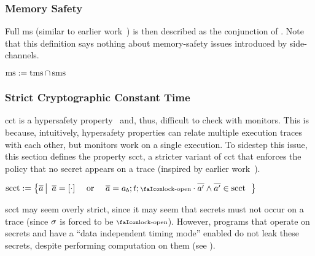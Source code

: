\documentclass[dvipsnames]{llncs}
\begin{document}
\subsubsection{Memory Safety}

Full \gls*{ms} (similar to earlier work~\cite{nagarakatte2009soft,nagarakatte2010cets,jim2002cyclone,necula2005ccured,michael2023mswasm}) is then described as the conjunction of .
Note that this definition says nothing about memory-safety issues introduced by side-channels.

\begin{definition}[\glsfirst*{ms}]\label{def:trace:msdef}
  $
  \operatorname{ms}:=\operatorname{tms} \cap \operatorname{sms}
  $
\end{definition}

\subsubsection{Strict Cryptographic Constant Time}

\gls*{cct} is a hypersafety property~\cite{barthe2018sec} and, thus, difficult to check with monitors.
This is because, intuitively, hypersafety properties can relate multiple execution traces with each other, but monitors work on a single execution.
To sidestep this issue, this section defines the property \gls*{scct}, a stricter variant of \gls*{cct} that enforces the policy that no secret appears on a trace (inspired by earlier work~\cite{almeida2017jasmin}).

\begin{definition}\label{def:trace:scctdef}
  
  \noindent$
  \scctsafe:=\left\{\trace \left|\begin{array}{rcl}
                                   \trace=\hole{\cdot} & \text{ or } & \trace=\event[_{b}];\sandboxtag;\unlock\cdot\trace['] \wedge \trace[']\in\scctsafe
                                 \end{array}\right.\right\}
  $
\end{definition}

\gls*{scct} may seem overly strict, since it may seem that secrets must not occur on a trace (since $\sigma$ is forced to be $\unlock$). 
However, programs that operate on secrets and have a ``data independent timing mode'' enabled do not leak these secrets, despite performing computation on them (see ). 
\end{document}
